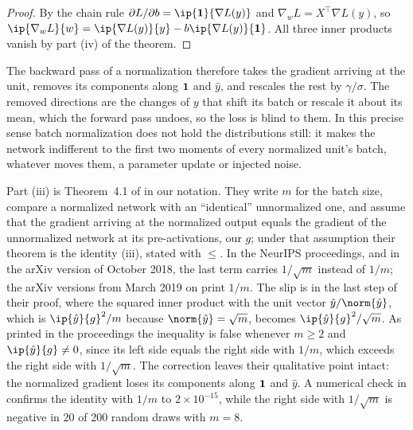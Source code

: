 \begin{refsection}
\begin{proof}
By the chain rule $\partial L/\partial b=\ip{\mechanismsones}{\nabla L(y)}$ and $\nabla_wL=X^\top\nabla L(y)$, so $\ip{\nabla_wL}{w}=\ip{\nabla L(y)}{y}-b\ip{\nabla L(y)}{\mechanismsones}$. All three inner products vanish by part (iv) of the theorem.
\end{proof}

The backward pass of a normalization therefore takes the gradient arriving at the unit, removes its components along $\mathbf{1}$ and $\hat y$, and rescales the rest by $\gamma/\sigma$. The removed directions are the changes of $y$ that shift its batch or rescale it about its mean, which the forward pass undoes, so the loss is blind to them. In this precise sense batch normalization does not hold the distributions still: it makes the network indifferent to the first two moments of every normalized unit's batch, whatever moves them, a parameter update or injected noise.

\begin{remark}\label{rem:mechanisms:printed}
Part (iii) is Theorem~4.1 of \textcite{SanturkarEtAl2018} in our notation. They write $m$ for the batch size, compare a normalized network with an \enquote{identical} unnormalized one, and assume that the gradient arriving at the normalized output equals the gradient of the unnormalized network at its pre-activations, our $g$; under that assumption their theorem is the identity (iii), stated with $\le$. In the NeurIPS proceedings, and in the arXiv version of October 2018, the last term carries $1/\sqrt m$ instead of $1/m$; the arXiv versions from March 2019 on print $1/m$. The slip is in the last step of their proof, where the squared inner product with the unit vector $\hat y/\norm{\hat y}$, which is $\ip{\hat y}{g}^2/m$ because $\norm{\hat y}=\sqrt m$, becomes $\ip{\hat y}{g}^2/\sqrt m$. As printed in the proceedings the inequality is false whenever $m\ge2$ and $\ip{\hat y}{g}\neq0$, since its left side equals the right side with $1/m$, which exceeds the right side with $1/\sqrt m$. The correction leaves their qualitative point intact: the normalized gradient loses its components along $\mathbf{1}$ and $\hat y$. A numerical check in  confirms the identity with $1/m$ to $2\times10^{-15}$, while the right side with $1/\sqrt m$ is negative in 20 of 200 random draws with $m=8$.
\end{remark}


\end{refsection}
